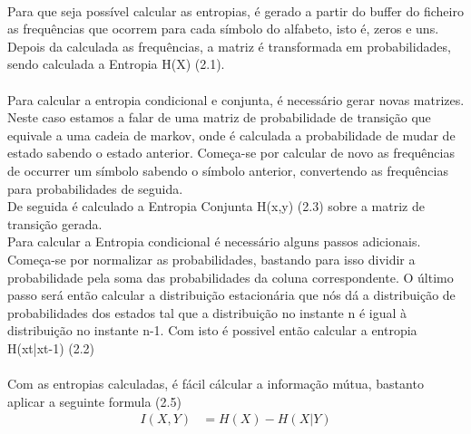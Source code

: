 \documentclass[paper=a4, fontsize=11pt]{scrartcl}
\numberwithin{equation}{section}		%
\numberwithin{figure}{section}			%
\numberwithin{table}{section}				%
\begin{document}
\paragraph{}
Para que seja possível calcular as entropias, é gerado a partir do buffer do ficheiro as frequências que ocorrem para cada símbolo do alfabeto, isto é, zeros e uns. Depois da calculada as frequências, a matriz é transformada em probabilidades, sendo calculada a Entropia H(X) (2.1).
\paragraph{}
Para calcular a entropia condicional e conjunta, é necessário gerar novas matrizes. Neste caso estamos a falar de uma matriz de probabilidade de transição que equivale a uma cadeia de markov, onde é calculada a probabilidade de mudar de estado sabendo o estado anterior.
Começa-se por calcular de novo as frequências de occurrer um símbolo sabendo o símbolo anterior, convertendo as frequências para probabilidades de seguida.
\\
De seguida é calculado a Entropia Conjunta H(x,y) (2.3) sobre a matriz de transição gerada.
\\Para calcular a Entropia condicional é necessário alguns passos adicionais. Começa-se por normalizar as probabilidades, bastando para isso dividir a probabilidade pela soma das probabilidades da coluna correspondente.
O último passo será então calcular a distribuição estacionária que nós dá a distribuição de probabilidades dos estados tal que a distribuição no instante n é igual à distribuição no instante n-1. Com isto é possivel então calcular a entropia H(xt|xt-1) (2.2)
\paragraph{}
Com as entropias calculadas, é fácil cálcular a informação 	mútua, bastanto aplicar a seguinte formula (2.5)
	\begin{align}
  	I(X,Y) &= H(X) - H(X|Y)
	\end{align}
\end{document}
